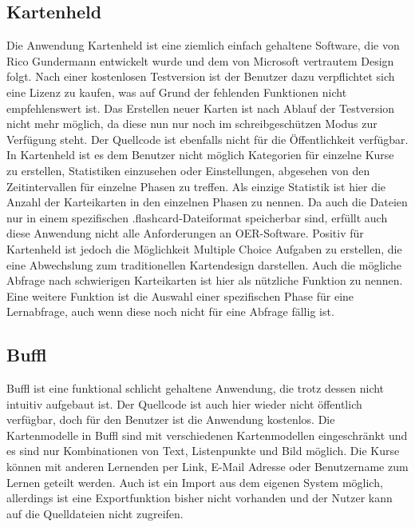 \subsection{Kartenheld}
Die Anwendung Kartenheld \cite{kartenheld} ist eine ziemlich einfach gehaltene Software, die von Rico Gundermann entwickelt wurde und dem von Microsoft vertrautem Design folgt. Nach einer kostenlosen Testversion ist der Benutzer dazu verpflichtet sich eine Lizenz zu kaufen, was auf Grund der fehlenden Funktionen nicht empfehlenswert ist. Das Erstellen neuer Karten ist nach Ablauf der Testversion nicht mehr möglich, da diese nun nur noch im schreibgeschützen Modus zur Verfügung steht. Der Quellcode ist ebenfalls nicht für die Öffentlichkeit verfügbar. In Kartenheld ist es dem Benutzer nicht möglich Kategorien für einzelne Kurse zu erstellen, Statistiken einzusehen oder Einstellungen, abgesehen von den Zeitintervallen für einzelne Phasen zu treffen. Als einzige Statistik ist hier die Anzahl der Karteikarten in den einzelnen Phasen zu nennen. Da auch die Dateien nur in einem spezifischen .flashcard-Dateiformat speicherbar sind, erfüllt auch diese Anwendung nicht alle Anforderungen an OER-Software.
Positiv für Kartenheld ist jedoch die Möglichkeit Multiple Choice Aufgaben zu erstellen, die eine Abwechslung zum traditionellen Kartendesign darstellen. Auch die mögliche Abfrage nach schwierigen Karteikarten ist hier als nützliche Funktion zu nennen. Eine weitere Funktion ist die Auswahl einer spezifischen Phase für eine Lernabfrage, auch wenn diese noch nicht für eine Abfrage fällig ist. \\


\subsection{Buffl}
Buffl \cite{buffl} ist eine funktional schlicht gehaltene Anwendung, die trotz dessen nicht intuitiv aufgebaut ist. Der Quellcode ist auch hier wieder nicht öffentlich verfügbar, doch für den Benutzer ist die Anwendung kostenlos. Die Kartenmodelle in Buffl sind mit verschiedenen Kartenmodellen eingeschränkt und es sind nur Kombinationen von Text, Listenpunkte und Bild möglich. Die Kurse können mit anderen Lernenden per Link, E-Mail Adresse oder Benutzername zum Lernen geteilt werden. Auch ist ein Import aus dem eigenen System möglich, allerdings ist eine Exportfunktion bisher nicht vorhanden und der Nutzer kann auf die Quelldateien nicht zugreifen. \



